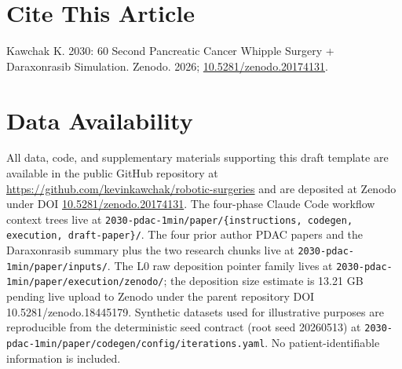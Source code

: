 {}
\section*{Cite This Article}
\label{sec:cite}

Kawchak K. 2030: 60 Second Pancreatic Cancer Whipple Surgery +
Daraxonrasib Simulation. Zenodo. 2026;
\href{https://doi.org/10.5281/zenodo.20174131}{10.5281/zenodo.20174131}.

{}
\section*{Data Availability}
\label{sec:data}


All data, code, and supplementary materials supporting this draft
template are available in the public GitHub repository at
\url{https://github.com/kevinkawchak/robotic-surgeries} and are
deposited at Zenodo under DOI
\href{https://doi.org/10.5281/zenodo.20174131}{10.5281/zenodo.20174131}.
The four-phase Claude Code workflow context trees live at
\texttt{2030-pdac-1min/paper/\{instructions, codegen, execution,
draft-paper\}/}. The four prior author PDAC papers and the
Daraxonrasib summary plus the two research chunks live at
\texttt{2030-pdac-1min/paper/inputs/}. The L0 raw deposition pointer
family lives at \texttt{2030-pdac-1min/paper/execution/zenodo/}; the
deposition size estimate is 13.21 GB pending live upload to Zenodo
under the parent repository DOI 10.5281/zenodo.18445179. Synthetic
datasets used for illustrative purposes are reproducible from the
deterministic seed contract (root seed 20260513) at
\texttt{2030-pdac-1min/paper/codegen/config/iterations.yaml}. No
patient-identifiable information is included.
